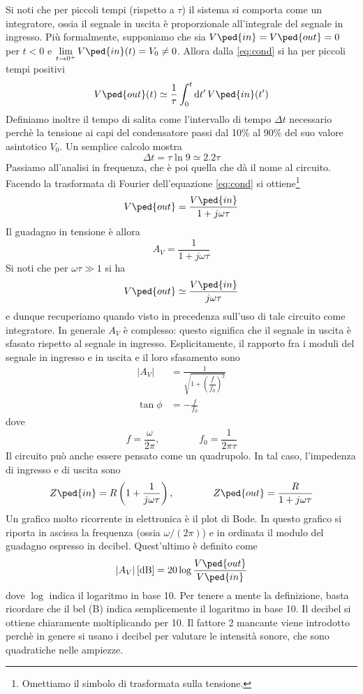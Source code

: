 \documentclass[a4paper, 11pt]{article}
\begin{document}
	Si noti che per piccoli tempi (rispetto a $\tau$) il sistema si comporta come un integratore, ossia il segnale in uscita è proporzionale all'integrale del segnale in ingresso. Più formalmente, supponiamo che sia $V\ped{in}=V\ped{out}=0$ per $t<0$ e $\lim\limits_{t\to0^+}V\ped{in}(t)=V_0\neq0$. Allora dalla \ref{eq:cond} si ha per piccoli tempi positivi
	\[V\ped{out}(t)\simeq\frac{1}{\tau}\int_0^t\d t'\,V\ped{in}(t')\]
	Definiamo inoltre il tempo di salita come l'intervallo di tempo $\Delta t$ necessario perchè la tensione ai capi del condensatore passi dal 10\% al 90\% del suo valore asintotico $V_0$. Un semplice calcolo mostra
	\[\Delta t=\tau\ln9\simeq2.2\tau\]
	Passiamo all'analisi in frequenza, che è poi quella che dà il nome al circuito. Facendo la trasformata di Fourier dell'equazione \ref{eq:cond} si ottiene\footnote{Omettiamo il simbolo di trasformata sulla tensione.}
	\[V\ped{out}=\frac{V\ped{in}}{1+j\omega \tau}\]
	Il guadagno in tensione è allora
	\[A_V=\frac{1}{1+j\omega \tau}\]
	Si noti che per $\omega\tau\gg1$ si ha
	\[V\ped{out}\simeq\frac{V\ped{in}}{j\omega\tau}\]
	e dunque recuperiamo quando visto in precedenza sull'uso di tale circuito come integratore.	In generale $A_V$ è complesso: questo significa che il segnale in uscita è sfasato rispetto al segnale in ingresso. Esplicitamente, il rapporto fra i moduli del segnale in ingresso e in uscita e il loro sfasamento sono
	\begin{align*}
		|A_V|&=\frac{1}{\sqrt{1+\left(\dfrac{f}{f_0}\right)^2}}\\\tan\phi&=-\frac{f}{f_0}	
	\end{align*}
	dove
	\[f=\frac{\omega}{2\pi},\qquad\qquad f_0=\frac{1}{2\pi\tau}\]
	Il circuito può anche essere pensato come un quadrupolo. In tal caso, l'impedenza di ingresso e di uscita sono
	\[Z\ped{in}=R\left(1+\frac{1}{j\omega\tau}\right),\qquad\qquad Z\ped{out}=\frac{R}{1+j\omega\tau}\]
	Un grafico molto ricorrente in elettronica è il plot di Bode. In questo grafico si riporta in ascissa la frequenza (ossia $\omega/(2\pi)$) e in ordinata il modulo del guadagno espresso in decibel. Quest'ultimo è definito come
	\[|A_V|\,[\mathrm{dB}]=20\log\frac{V\ped{out}}{V\ped{in}}\]
	dove $\log$ indica il logaritmo in base 10. Per tenere a mente la definizione, basta ricordare che il bel (B) indica semplicemente il logaritmo in base 10. Il decibel si ottiene chiaramente moltiplicando per 10. Il fattore 2 mancante viene introdotto perchè in genere si usano i decibel per valutare le intensità sonore, che sono quadratiche nelle ampiezze. 
	
\end{document}
